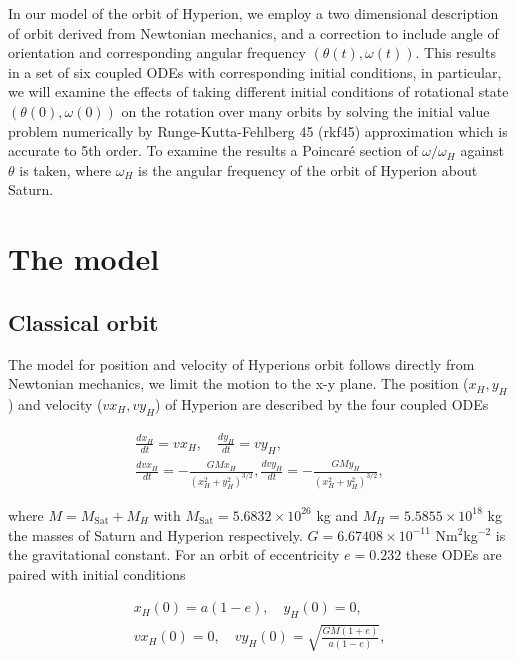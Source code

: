 \documentclass[10pt, twocolumn]{article} %
\begin{document}
In our model of the orbit of Hyperion, we employ a two dimensional description of orbit derived from Newtonian mechanics\cite{Newtonian_orbit}, and a correction to include angle of orientation and corresponding angular frequency $(\theta(t), \omega(t))$. This results in a set of six coupled ODEs with corresponding initial conditions, in particular, we will examine the effects of taking different initial conditions of rotational state $(\theta(0),\omega(0))$ on the rotation over many orbits by solving the initial value problem numerically by Runge-Kutta-Fehlberg 45 (rkf45) approximation which is accurate to 5th order. To examine the results a Poincar\'e section of $\omega / \omega_H$ against $\theta$ is taken, where $\omega_H$ is the angular frequency of the orbit of Hyperion about Saturn.

\section*{The model}

\subsection*{Classical orbit}

The model for position and velocity of Hyperions orbit follows directly from Newtonian mechanics, we limit the motion to the x-y plane. The position ($x_H, y_H$) and velocity ($vx_H, vy_H$) of Hyperion are described by the four coupled ODEs

\begin{gather}
\label{position_ODEs}
  \frac{d x_{H}}{d t}=v x_{H},\quad \frac{d y_{H}}{d t}=v y_{H},\\
  \frac{d v x_{H}}{d t}=-\frac{G M x_{H}}{\left(x_{H}^{2}+y_{H}^{2}\right)^{3 / 2}}, \frac{d v y_{H}}{d t}=-\frac{G M y_{H}}{\left(x_{H}^{2}+y_{H}^{2}\right)^{3 / 2}},
\end{gather}

where $M = M_\text{Sat} + M_H$ with $M_\text{Sat} = 5.6832 \times 10^{26}$ kg and $M_H = 5.5855 \times 10^{18}$ kg the masses of Saturn and Hyperion respectively. $G = 6.67408 \times 10^{-11}$ Nm$^2$kg$^{-2}$ is the gravitational constant. For an orbit of eccentricity $e = 0.232$ these ODEs are paired with initial conditions

\begin{gather}
\label{position_ICs}
  x_H(0) = a(1-e), \quad y_H(0) = 0,\\
  vx_H(0) = 0, \quad vy_H(0) = \sqrt{\frac{GM(1+e)}{a(1-e)}},
\end{gather}
\end{document}
